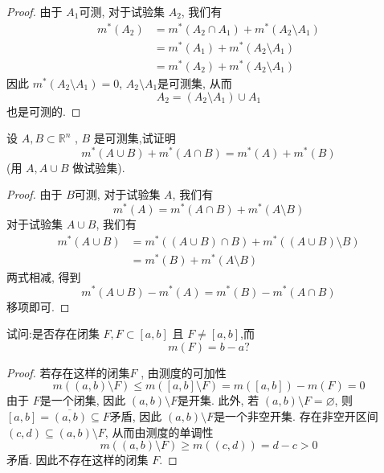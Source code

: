 \documentclass[../main.tex]{subfiles}
\begin{document}
\begin{proof}
  由于 \(  A_1  \)可测, 对于试验集 \(  A_2 \), 我们有 \[
  \begin{aligned}
  m^{*}\left( A_2 \right)&= m^{*}\left(  A_2 \cap A_1\right)+ m^{*}\left(  A_2\setminus A_1\right)\\ 
   &= m^{*}\left( A_1 \right)+ m^{*}\left( A_2\setminus A_1 \right)\\ 
    &= m^{*}\left( A_2 \right)+ m^{*}\left( A_2\setminus A_1 \right)    
  \end{aligned}
  \]因此 \(  m^{*}\left( A_2\setminus A_1 \right)= 0   \), \(  A_2\setminus A_1  \)是可测集, 从而 \[
  A_2= \left( A_2\setminus A_1 \right)\cup A_1 
  \]也是可测的.    
\end{proof}
\begin{exercise}{}{}
设 $A,B\subset\mathbb{R}^n$ , \(  B  \) 是可测集,试证明
\[m^*(A\cup B)+m^*(A\cap B)=m^*(A)+m^*(B)\]
(用 $A,A\cup B$ 做试验集).
\end{exercise}
\begin{proof}
    由于 \( B  \)可测, 对于试验集 \(  A  \), 我们有 \[
    m^{*}\left( A \right)= m^{*}\left( A\cap B \right)+ m^{*}\left( A\setminus B \right)   
    \]对于试验集 \(  A\cup B  \), 我们有 \[
   \begin{aligned}
    m^{*}\left( A\cup B \right)&= m^{*}\left( \left( A\cup B \right)\cap B  \right)+ m^{*}\left( \left( A\cup B \right)\setminus B  \right)    \\ 
     &= m^{*}\left( B \right)+ m^{*}\left( A\setminus B \right)  
   \end{aligned}
    \]   两式相减, 得到 \[
    m^{*}\left( A\cup B \right)-m^{*}\left( A \right)= m^{*}\left( B \right)-m^{*}\left( A\cap B \right)    
    \]移项即可.
\end{proof}
\begin{exercise}{}{}
试问:是否存在闭集 $F,F\subset [a,b]$ 且 $F\neq [a,b]$,而
\[m(F)=b-a?\]
\end{exercise}
\begin{proof}
    若存在这样的闭集\(  F  \) ,  由测度的可加性 \[
    m\left(\left( a,b \right)\setminus F  \right)\le m\left( \left[ a,b \right]\setminus F  \right)  = m\left( [a,b] \right)-m\left( F \right)   = 0 
    \] 由于 \(  F  \)是一个闭集, 因此 \(  \left( a,b \right)\setminus F   \)是开集. 此外, 若 \(  \left( a,b \right)\setminus F   = \varnothing\), 则 \( \left[ a,b \right]=   \overline{\left( a,b \right) }\subseteq F  \)矛盾,  因此 \(  \left( a,b \right)\setminus F   \)是一个非空开集.    存在非空开区间 \(  \left( c,d \right)\subseteq \left( a,b \right)\setminus F   \), 从而由测度的单调性  \[
    m\left(\left( a,b \right)\setminus F  \right) \ge m\left( \left( c,d \right)  \right)= d-c> 0 
    \]矛盾. 因此不存在这样的闭集 \(  F  \). 
\end{proof}
\end{document}
